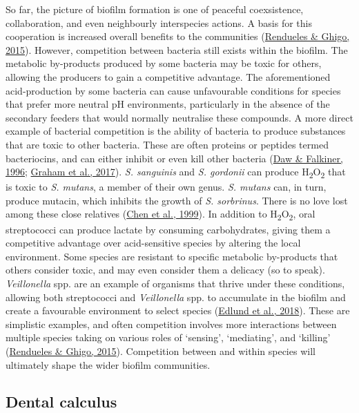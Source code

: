\documentclass[
  b5paper,
]{book}
\begin{document}
So far, the picture of biofilm formation is one of peaceful
coexsistence, collaboration, and even neighbourly interspecies actions.
A basis for this cooperation is increased overall benefits to the
communities
(\protect\hyperlink{ref-renduelesMechanismsCompetition2015}{Rendueles \&
Ghigo, 2015}). However, competition between bacteria still exists within
the biofilm. The metabolic by-products produced by some bacteria may be
toxic for others, allowing the producers to gain a competitive
advantage. The aforementioned acid-production by some bacteria can cause
unfavourable conditions for species that prefer more neutral pH
environments, particularly in the absence of the secondary feeders that
would normally neutralise these compounds. A more direct example of
bacterial competition is the ability of bacteria to produce substances
that are toxic to other bacteria. These are often proteins or peptides
termed bacteriocins, and can either inhibit or even kill other bacteria
(\protect\hyperlink{ref-dawBacteriocinsNature1996}{Daw \& Falkiner,
1996}; \protect\hyperlink{ref-grahamEnterococcusFaecalis2017}{Graham et
al., 2017}). \emph{S. sanguinis} and \emph{S. gordonii} can produce
H\textsubscript{2}O\textsubscript{2} that is toxic to \emph{S. mutans},
a member of their own genus. \emph{S. mutans} can, in turn, produce
mutacin, which inhibits the growth of \emph{S. sorbrinus}. There is no
love lost among these close relatives
(\protect\hyperlink{ref-chenSpecificGenes1999}{Chen et al., 1999}). In
addition to H\textsubscript{2}O\textsubscript{2}, oral streptococci can
produce lactate by consuming carbohydrates, giving them a competitive
advantage over acid-sensitive species by altering the local environment.
Some species are resistant to specific metabolic by-products that others
consider toxic, and may even consider them a delicacy (so to speak).
\emph{Veillonella} spp. are an example of organisms that thrive under
these conditions, allowing both streptococci and \emph{Veillonella} spp.
to accumulate in the biofilm and create a favourable environment to
select species
(\protect\hyperlink{ref-edlundUncoveringComplex2018}{Edlund et al.,
2018}). These are simplistic examples, and often competition involves
more interactions between multiple species taking on various roles of
`sensing', `mediating', and `killing'
(\protect\hyperlink{ref-renduelesMechanismsCompetition2015}{Rendueles \&
Ghigo, 2015}). Competition between and within species will ultimately
shape the wider biofilm communities.

\hypertarget{dental-calculus}{%
\subsection{Dental calculus}\label{dental-calculus}}
\end{document}
